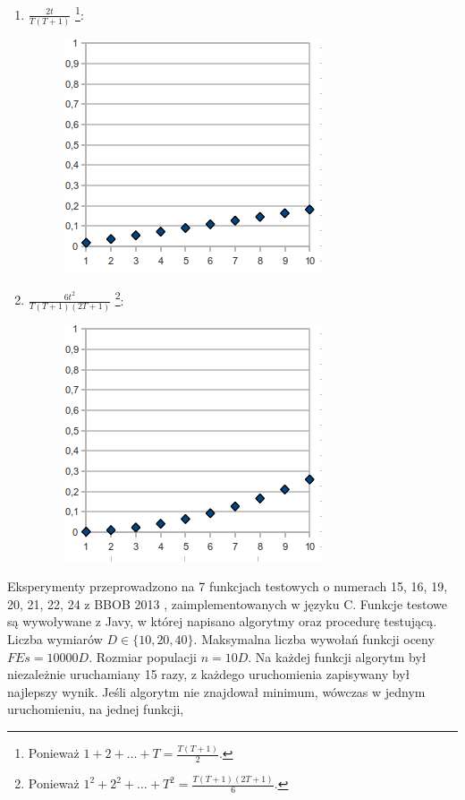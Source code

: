 \documentclass[12pt, a4paper]{article}
\begin{document}
\begin{enumerate}
\begin{figure}[H]
  \end{figure}
 \item $\frac{2t}{T(T+1)}$
\footnote{Ponieważ $1 + 2 + \dots + T = \frac{T(T+1)}{2}$.}:
  \begin{figure}[H]
  \centering
  \includegraphics[scale=0.5]{img/4.png} 
  \end{figure}
 \item $\frac{6t^2}{T(T+1)(2T+1)}$
\footnote{Ponieważ $1^2 + 2^2 + \dots + T^2 = \frac{T(T+1)(2T+1)}{6}$.}:
  \begin{figure}[H]
  \centering
  \includegraphics[scale=0.5]{img/5.png} 
  \end{figure}
\end{enumerate}
Eksperymenty przeprowadzono na 7 funkcjach testowych o numerach 15, 16, 19, 20, 21, 22, 24 z BBOB 2013 \cite{finck, hansen}, 
zaimplementowanych w języku C.
Funkcje testowe są wywoływane z Javy, w której napisano algorytmy oraz procedurę testującą.
Liczba wymiarów $D \in \{10, 20, 40\}$. Maksymalna liczba wywołań funkcji oceny $FEs = 10000D$. 
Rozmiar populacji $n = 10D$. 
Na każdej funkcji algorytm był niezależnie uruchamiany 15 razy, z każdego uruchomienia zapisywany był najlepszy wynik.
Jeśli algorytm nie znajdował minimum, wówczas w jednym uruchomieniu, na jednej funkcji, 
\end{document}
